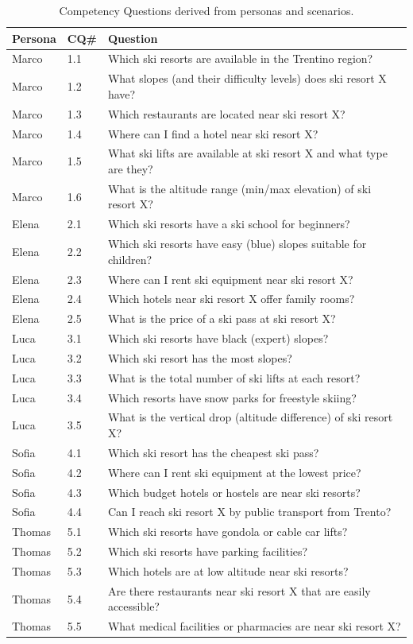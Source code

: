 \begin{table}[h!]
\centering
\small
\begin{tabular}{|l|l|p{10cm}|}
\hline
\textbf{Persona} & \textbf{CQ\#} & \textbf{Question} \\
\hline
Marco & 1.1 & Which ski resorts are available in the Trentino region? \\
Marco & 1.2 & What slopes (and their difficulty levels) does ski resort X have? \\
Marco & 1.3 & Which restaurants are located near ski resort X? \\
Marco & 1.4 & Where can I find a hotel near ski resort X? \\
Marco & 1.5 & What ski lifts are available at ski resort X and what type are they? \\
Marco & 1.6 & What is the altitude range (min/max elevation) of ski resort X? \\
\hline
Elena & 2.1 & Which ski resorts have a ski school for beginners? \\
Elena & 2.2 & Which ski resorts have easy (blue) slopes suitable for children? \\
Elena & 2.3 & Where can I rent ski equipment near ski resort X? \\
Elena & 2.4 & Which hotels near ski resort X offer family rooms? \\
Elena & 2.5 & What is the price of a ski pass at ski resort X? \\
\hline
Luca & 3.1 & Which ski resorts have black (expert) slopes? \\
Luca & 3.2 & Which ski resort has the most slopes? \\
Luca & 3.3 & What is the total number of ski lifts at each resort? \\
Luca & 3.4 & Which resorts have snow parks for freestyle skiing? \\
Luca & 3.5 & What is the vertical drop (altitude difference) of ski resort X? \\
\hline
Sofia & 4.1 & Which ski resort has the cheapest ski pass? \\
Sofia & 4.2 & Where can I rent ski equipment at the lowest price? \\
Sofia & 4.3 & Which budget hotels or hostels are near ski resorts? \\
Sofia & 4.4 & Can I reach ski resort X by public transport from Trento? \\
\hline
Thomas & 5.1 & Which ski resorts have gondola or cable car lifts? \\
Thomas & 5.2 & Which ski resorts have parking facilities? \\
Thomas & 5.3 & Which hotels are at low altitude near ski resorts? \\
Thomas & 5.4 & Are there restaurants near ski resort X that are easily accessible? \\
Thomas & 5.5 & What medical facilities or pharmacies are near ski resort X? \\
\hline
\end{tabular}
\caption{Competency Questions derived from personas and scenarios.}
\label{tab:cqs}
\end{table}

